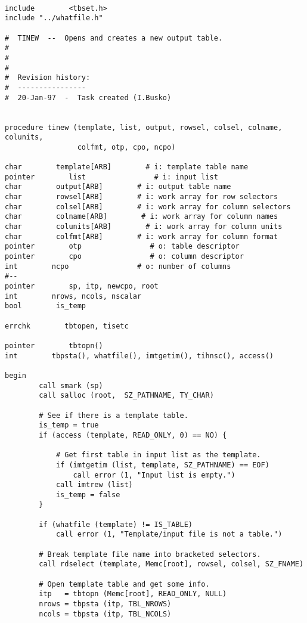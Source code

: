\begin{verbatim}

include        <tbset.h>
include "../whatfile.h"

#  TINEW  --  Opens and creates a new output table.
#
#
#
#  Revision history:
#  ----------------
#  20-Jan-97  -  Task created (I.Busko)


procedure tinew (template, list, output, rowsel, colsel, colname, colunits, 
                 colfmt, otp, cpo, ncpo)

char        template[ARB]        # i: template table name
pointer        list                # i: input list
char        output[ARB]        # i: output table name
char        rowsel[ARB]        # i: work array for row selectors
char        colsel[ARB]        # i: work array for column selectors
char        colname[ARB]        # i: work array for column names
char        colunits[ARB]        # i: work array for column units
char        colfmt[ARB]        # i: work array for column format
pointer        otp                # o: table descriptor
pointer        cpo                # o: column descriptor
int        ncpo                # o: number of columns
#--
pointer        sp, itp, newcpo, root
int        nrows, ncols, nscalar
bool        is_temp

errchk        tbtopen, tisetc

pointer        tbtopn()
int        tbpsta(), whatfile(), imtgetim(), tihnsc(), access()

begin
        call smark (sp)
        call salloc (root,  SZ_PATHNAME, TY_CHAR)

        # See if there is a template table.
        is_temp = true
        if (access (template, READ_ONLY, 0) == NO) {

            # Get first table in input list as the template.
            if (imtgetim (list, template, SZ_PATHNAME) == EOF)
                call error (1, "Input list is empty.")
            call imtrew (list)
            is_temp = false
        }

        if (whatfile (template) != IS_TABLE)
            call error (1, "Template/input file is not a table.")

        # Break template file name into bracketed selectors.
        call rdselect (template, Memc[root], rowsel, colsel, SZ_FNAME)

        # Open template table and get some info.
        itp   = tbtopn (Memc[root], READ_ONLY, NULL)
        nrows = tbpsta (itp, TBL_NROWS)
        ncols = tbpsta (itp, TBL_NCOLS)


\end{verbatim}
